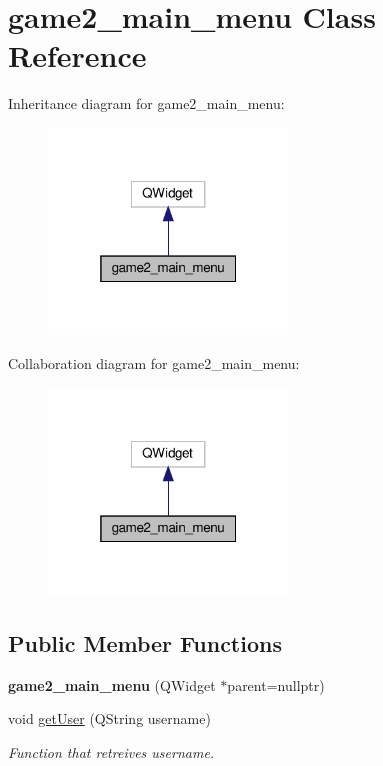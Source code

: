 \hypertarget{classgame2__main__menu}{}\section{game2\+\_\+main\+\_\+menu Class Reference}
\label{classgame2__main__menu}


Inheritance diagram for game2\+\_\+main\+\_\+menu\+:\nopagebreak
\begin{figure}[H]
\begin{center}
\leavevmode
\includegraphics[width=181pt]{classgame2__main__menu__inherit__graph}
\end{center}
\end{figure}


Collaboration diagram for game2\+\_\+main\+\_\+menu\+:\nopagebreak
\begin{figure}[H]
\begin{center}
\leavevmode
\includegraphics[width=181pt]{classgame2__main__menu__coll__graph}
\end{center}
\end{figure}
\subsection*{Public Member Functions}
\begin{DoxyCompactItemize}
\item 
\mbox{\label{classgame2__main__menu_a012586b37247c91835178378b795945b}} 
{\bfseries game2\+\_\+main\+\_\+menu} (Q\+Widget $\ast$parent=nullptr)
\item 
void \hyperlink{classgame2__main__menu_aa77f5a5ba961a25e6f9ed6112de186ad}{get\+User} (Q\+String username)
\begin{DoxyCompactList}\small\item\em Function that retreives username. \end{DoxyCompactList}\end{DoxyCompactItemize}
